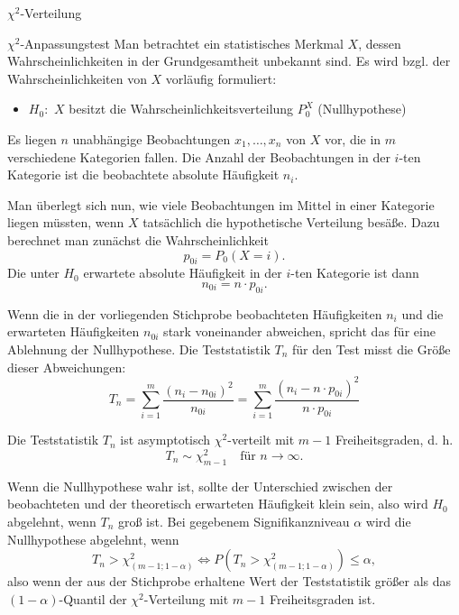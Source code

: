 \begin{defi}{$\chi^2$-Verteilung}
\end{defi}

\begin{defi}{$\chi^2$-Anpassungstest}
    Man betrachtet ein statistisches Merkmal $X$, dessen Wahrscheinlichkeiten in der Grundgesamtheit unbekannt sind.
    Es wird bzgl. der Wahrscheinlichkeiten von $X$ vorläufig formuliert:
    \begin{itemize}
        \item $H_0:$ $X$ besitzt die Wahrscheinlichkeitsverteilung $P^X_0$ (Nullhypothese)
    \end{itemize}

    Es liegen $n$ unabhängige Beobachtungen $x_1, \ldots, x_n$ von $X$ vor, die in $m$ verschiedene Kategorien fallen.
    Die Anzahl der Beobachtungen in der $i$-ten Kategorie ist die beobachtete absolute Häufigkeit $n_i$.

    Man überlegt sich nun, wie viele Beobachtungen im Mittel in einer Kategorie liegen müssten, wenn $X$ tatsächlich die hypothetische Verteilung besäße.
    Dazu berechnet man zunächst die Wahrscheinlichkeit
    \[
        p_{0i} = P_0(X = i).
    \]
    Die unter $H_0$ erwartete absolute Häufigkeit in der $i$-ten Kategorie ist dann
    \[
        n_{0i} = n \cdot p_{0i}.
    \]

    Wenn die in der vorliegenden Stichprobe beobachteten Häufigkeiten $n_i$ und die erwarteten Häufigkeiten $n_{0i}$ stark voneinander abweichen, spricht das für eine Ablehnung der Nullhypothese.
    Die Teststatistik $T_n$ für den Test misst die Größe dieser Abweichungen:
    \[
        T_n = \sum_{i = 1}^{m} \frac{(n_i - n_{0i})^2}{n_{0i}} = \sum_{i = 1}^{m} \frac{(n_i - n \cdot p_{0i})^2}{n \cdot p_{0i}}
    \]

    Die Teststatistik $T_n$ ist asymptotisch $\chi^2$-verteilt mit $m - 1$ Freiheitsgraden, d. h.
    \[
        T_n \sim \chi^2_{m - 1} \quad \text{für } n \to \infty.
    \]

    Wenn die Nullhypothese wahr ist, sollte der Unterschied zwischen der beobachteten und der theoretisch erwarteten Häufigkeit klein sein, also wird $H_0$ abgelehnt, wenn $T_n$ groß ist.
    Bei gegebenem Signifikanzniveau $\alpha$ wird die Nullhypothese abgelehnt, wenn
    \[
        T_n > \chi^2_{(m - 1; 1 - \alpha)} \iff P(T_n > \chi^2_{(m - 1; 1 - \alpha)}) \leq \alpha,
    \]
    also wenn der aus der Stichprobe erhaltene Wert der Teststatistik größer als das $(1 - \alpha)$-Quantil der $\chi^2$-Verteilung mit $m - 1$ Freiheitsgraden ist.
\end{defi}

